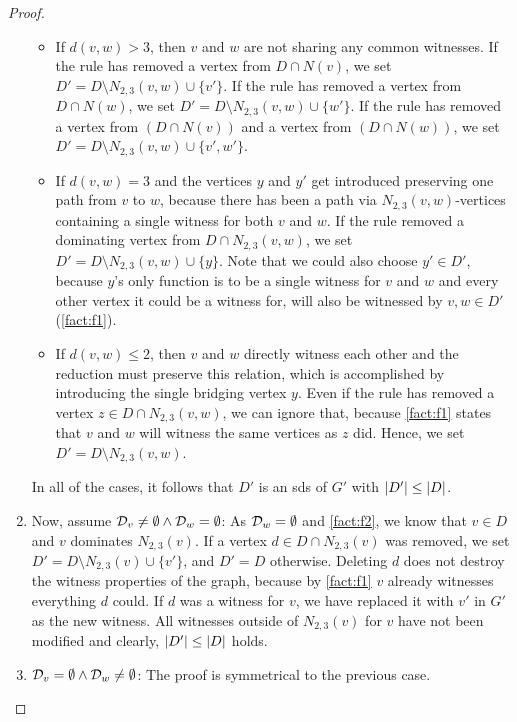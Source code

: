 \begin{proof}
\begin{enumerate}
\begin{itemize}
            \item If $d(v,w) > 3$, then $v$ and $w$ are not sharing any common witnesses. 
            If the rule has removed a vertex from $D \cap N(v)$, we set $D' = D \setminus N_{2,3}(v,w) \cup \{v'\}$.
            If the rule has removed a vertex from $D \cap N(w)$, we  set $D' = D \setminus N_{2,3}(v,w) \cup \{w'\}$.
            If the rule has removed a vertex from $(D \cap N(v))$ and a vertex from $(D \cap N(w))$, we set $D' = D \setminus N_{2,3}(v,w) \cup \{v', w'\}$.
            \item If $d(v,w) = 3$ and the vertices $y$ and $y'$ get introduced preserving one path from $v$ to $w$, because there has been a path via $N_{2,3}(v,w)$-vertices containing a single witness for both $v$ and $w$.
            If the rule removed a dominating vertex from $D \cap N_{2,3}(v, w)$, we set $D' = D \setminus N_{2,3}(v,w) \cup \{y\}$. Note that we could also choose $y' \in D'$, because $y$'s only function is to be a single witness for $v$ and $w$ and every other vertex it could be a witness for, will also be witnessed by $v,w \in D'$ (\cref{fact:f1}).
            \item If $d(v,w) \leq 2$, then $v$ and $w$ directly witness each other and the reduction must preserve this relation, which is accomplished by introducing the single bridging vertex $y$. 
            Even if the rule has removed a vertex $z \in D \cap N_{2,3}(v,w)$, we can ignore that, because \cref{fact:f1} states that $v$ and $w$ will witness the same vertices as $z$ did. Hence, we set $D' = D \setminus N_{2,3}(v,w)$.
        \end{itemize}
        
        In all of the cases, it follows that $D'$ is an sds of $G'$ with $\abs{D'} \leq \abs{D}$.
        
        \item  Now, assume $ \mathcal{D}_{v} \neq \emptyset  \wedge \mathcal{D}_{w} = \emptyset$: As $\mathcal{D}_{w} = \emptyset$ and \cref{fact:f2}, we know that $v \in D$ and $v$ dominates $N_{2,3}(v)$. 
        If a vertex $d \in D \cap N_{2,3}(v)$ was removed, we set $D' = D \setminus N_{2,3}(v) \cup \{v'\}$, and $D' = D$ otherwise.
        Deleting $d$ does not destroy the witness properties of the graph, because by \cref{fact:f1} $v$ already witnesses everything $d$ could. 
        If $d$ was a witness for $v$, we have replaced it with $v'$ in $G'$ as the new witness.
        All witnesses outside of $N_{2,3}(v)$  for $v$ have not been modified and clearly, $\abs{D'} \leq \abs{D}$ holds.
        \item  $ \mathcal{D}_{v} = \emptyset  \wedge \mathcal{D}_{w} \neq  \emptyset $: The proof is symmetrical to the previous case.
    \end{enumerate}


\end{proof}
